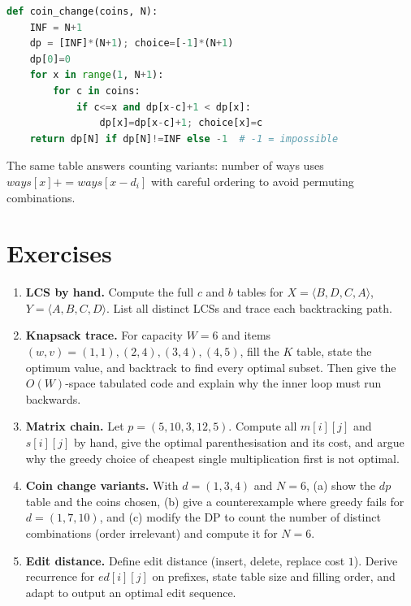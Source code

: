 \begin{lstlisting}[language=Python]
def coin_change(coins, N):
    INF = N+1
    dp = [INF]*(N+1); choice=[-1]*(N+1)
    dp[0]=0
    for x in range(1, N+1):
        for c in coins:
            if c<=x and dp[x-c]+1 < dp[x]:
                dp[x]=dp[x-c]+1; choice[x]=c
    return dp[N] if dp[N]!=INF else -1  # -1 = impossible
\end{lstlisting}

The same table answers counting variants: number of ways uses $\mathit{ways}[x]+= \mathit{ways}[x-d_i]$ with careful ordering to avoid permuting combinations.
\section{Exercises}
\label{sec:dp-exercises}
\begin{enumerate}
    \item \textbf{LCS by hand.} Compute the full $c$ and $b$ tables for $X=\langle B,D,C,A\rangle$, $Y=\langle A,B,C,D\rangle$. List all distinct LCSs and trace each backtracking path.

    \item \textbf{Knapsack trace.} For capacity $W=6$ and items $(w,v)=(1,1),(2,4),(3,4),(4,5)$, fill the $K$ table, state the optimum value, and backtrack to find every optimal subset. Then give the $O(W)$-space tabulated code and explain why the inner loop must run backwards.

    \item \textbf{Matrix chain.} Let $p=(5,10,3,12,5)$. Compute all $m[i][j]$ and $s[i][j]$ by hand, give the optimal parenthesisation and its cost, and argue why the greedy choice of cheapest single multiplication first is not optimal.

    \item \textbf{Coin change variants.} With $d=(1,3,4)$ and $N=6$, (a) show the $\mathit{dp}$ table and the coins chosen, (b) give a counterexample where greedy fails for $d=(1,7,10)$, and (c) modify the DP to count the number of distinct combinations (order irrelevant) and compute it for $N=6$.

    \item \textbf{Edit distance.} Define edit distance (insert, delete, replace cost $1$). Derive recurrence for $\mathit{ed}[i][j]$ on prefixes, state table size and filling order, and adapt to output an optimal edit sequence.
\end{enumerate}
